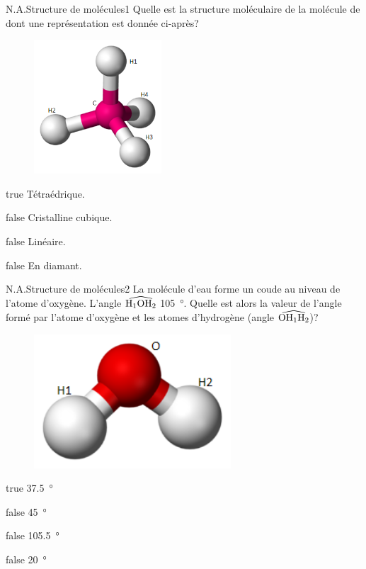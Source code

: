 \documentclass[11pt]{article}
\begin{document}
		\begin{question}{N.A.}{Structure de molécules}{1}{}
			Quelle est la structure moléculaire de la molécule de  dont une représentation est donnée ci-après?
			\begin{figure}
				\centering
				\includegraphics[height = 5cm]{Antoine/Figures_Antoine/300px-Tetrahedral-3D-balls.png}
			\end{figure}
		\end{question}
		\begin{reponses}
			\item[true] Tétraédrique.
			\item[false] Cristalline cubique.
			\item[false] Linéaire.
			\item[false] En diamant.
		\end{reponses}
		
		\begin{question}{N.A.}{Structure de molécules}{2}{}
			La molécule d'eau forme un coude au niveau de l'atome d'oxygène. L'angle $\widehat{\ce{H}_1\ce{O}\ce{H}_2}$ \SI{105}{\degree}. Quelle est alors la valeur de l'angle formé par l'atome d'oxygène et les atomes d'hydrogène (angle $\widehat{\ce{O}\ce{H}_1\ce{H}_2}$)?
			\begin{figure}
				\centering
				\includegraphics[height = 5cm]{Antoine/Figures_Antoine/240px-Water-3D-balls.png}
			\end{figure}
		\end{question}
		\begin{reponses}
			\item[true] \SI{37.5}{\degree}
				\item[false] \SI{45}{\degree}
				\item[false] \SI{105.5}{\degree}
				\item[false] \SI{20}{\degree}
		\end{reponses}
		
\end{document}
